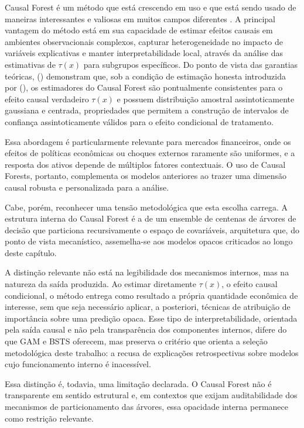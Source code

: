 \documentclass[	12pt, Times, openright, oneside, a4paper, english, brazil]{abntex2}
\begin{document}
Causal Forest é um método que está crescendo em uso e que está sendo usado de maneiras interessantes e valiosas em muitos campos diferentes \cite{Rehill2024CausalForest}. A principal vantagem do método está em sua capacidade de estimar efeitos causais em ambientes observacionais complexos, capturar heterogeneidade no impacto de variáveis explicativas e manter interpretabilidade local, através da análise das estimativas de $\tau(x)$ para subgrupos específicos. Do ponto de vista das garantias teóricas, \citeauthor{Wager2018} (\citeyear{Wager2018}) demonstram que, sob a condição de estimação honesta introduzida por \citeauthor{AtheyImbens2016} (\citeyear{AtheyImbens2016}), os estimadores do Causal Forest são pontualmente consistentes para o efeito causal verdadeiro $\tau(x)$ e possuem distribuição amostral assintoticamente gaussiana e centrada, propriedades que permitem a construção de intervalos de confiança assintoticamente válidos para o efeito condicional de tratamento.

Essa abordagem é particularmente relevante para mercados financeiros, onde os efeitos de políticas econômicas ou choques externos raramente são uniformes, e a resposta dos ativos depende de múltiplos fatores contextuais. O uso de Causal Forests, portanto, complementa os modelos anteriores ao trazer uma dimensão causal robusta e personalizada para a análise.

Cabe, porém, reconhecer uma tensão metodológica que esta escolha carrega. A estrutura interna do Causal Forest é a de um ensemble de centenas de árvores de decisão que particiona recursivamente o espaço de covariáveis, arquitetura que, do ponto de vista mecanístico, assemelha-se aos modelos opacos criticados ao longo deste capítulo.

A distinção relevante não está na legibilidade dos mecanismos internos, mas na natureza da saída produzida. Ao estimar diretamente $\tau(x)$, o efeito causal condicional, o método entrega como resultado a própria quantidade econômica de interesse, sem que seja necessário aplicar, a posteriori, técnicas de atribuição de importância sobre uma predição opaca. Esse tipo de interpretabilidade, orientada pela saída causal e não pela transparência dos componentes internos, difere do que GAM e BSTS oferecem, mas preserva o critério que orienta a seleção metodológica deste trabalho: a recusa de explicações retrospectivas sobre modelos cujo funcionamento interno é inacessível.

Essa distinção é, todavia, uma limitação declarada. O Causal Forest não é transparente em sentido estrutural e, em contextos que exijam auditabilidade dos mecanismos de particionamento das árvores, essa opacidade interna permanece como restrição relevante.
\end{document}
